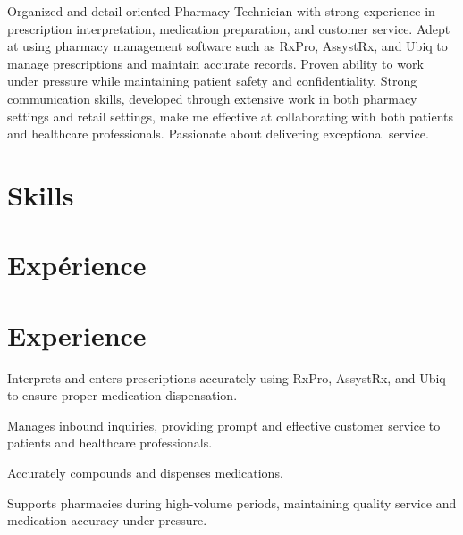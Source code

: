 \documentclass[letterpaper,10pt]{article}
\begin{document}

Organized and detail-oriented Pharmacy Technician with strong experience in prescription interpretation, medication preparation, and customer service. Adept at using pharmacy management software such as RxPro, AssystRx, and Ubiq to manage prescriptions and maintain accurate records. Proven ability to work under pressure while maintaining patient safety and confidentiality. Strong communication skills, developed through extensive work in both pharmacy settings and retail settings, make me effective at collaborating with both patients and healthcare professionals. Passionate about delivering exceptional service.

\section{Skills}

\begin{skill_list}
\end{skill_list}
\section{Expérience}

\section{Experience}

\begin{resume_list}
\item Interprets and enters prescriptions accurately using RxPro, AssystRx, and Ubiq to ensure proper medication dispensation.
\item Manages inbound inquiries, providing prompt and effective customer service to patients and healthcare professionals.
\item Accurately compounds and dispenses medications.
\item Supports pharmacies during high-volume periods, maintaining quality service and medication accuracy under pressure.
\end{resume_list}
\end{document}
